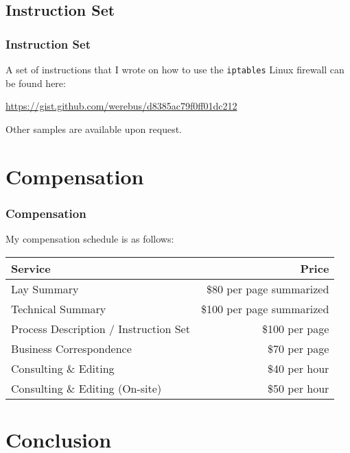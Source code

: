 \documentclass{beamer}
\begin{document}
\subsection{Instruction Set}
\begin{frame}
  \frametitle{Instruction Set}
  A set of instructions that I wrote on how to use the \texttt{iptables} Linux
  firewall can be found here:

  \href{https://gist.github.com/werebus/d8385ac79f0ff01dc212}%
       {https://gist.github.com/werebus/d8385ac79f0ff01dc212}
\end{frame}

\begin{frame}
  Other samples are available upon request.
\end{frame}

\section{Compensation}
\begin{frame}
  \frametitle{Compensation}
  My compensation schedule is as follows:
  \begin{center}
    \begin{tabular}[c]{|l|r|}
      \hline
      \textbf{Service} & \textbf{Price} \\ \hline
      Lay Summary & \$80 per page summarized \\
      Technical Summary & \$100 per page summarized \\
      Process Description / Instruction Set & \$100 per page  \\
      Business Correspondence & \$70 per page\\
      Consulting \& Editing & \$40 per hour \\
      Consulting \& Editing (On-site) & \$50 per hour \\
      \hline
    \end{tabular}
  \end{center}
\end{frame}
    
\section{Conclusion}
\frame{\quad}
\end{document}
